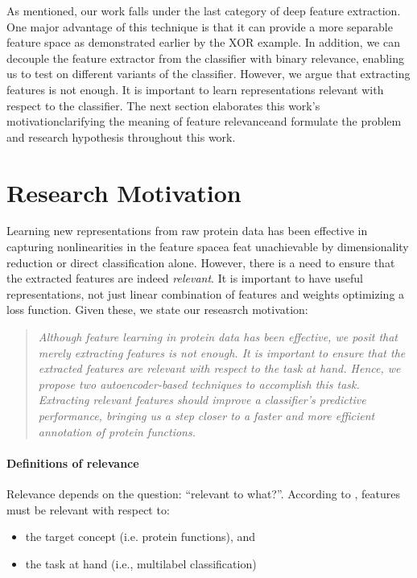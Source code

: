 \par As mentioned, our work falls under the last category of deep feature
extraction. One major advantage of this technique is that it can provide a
more separable feature space as demonstrated earlier by the XOR example. In
addition, we can decouple the feature extractor from the classifier with
binary relevance, enabling us to test on different variants of the
classifier. However, we argue that extracting features is not enough. It is
important to learn representations relevant with respect to the classifier.
The next section elaborates this work's motivation\textemdash clarifying the
meaning of feature relevance\textemdash and formulate the problem and
research hypothesis throughout this work.

\section{Research Motivation}
\label{Motivation}

\par Learning new representations from raw protein data has been effective in
capturing nonlinearities in the feature space\textemdash a feat unachievable
by dimensionality reduction or direct classification alone. However, there is
a need to ensure that the extracted features are indeed \textit{relevant}. It
is important to have useful representations, not just linear combination of
features and weights optimizing a loss function. Given these, we state our
reseasrch motivation:

\begin{quote}
  \itshape
  \small
  Although feature learning in protein data has been effective, we posit that
  merely extracting features is not enough. It is important to ensure that
  the extracted features are relevant with respect to the task at hand.
  Hence, we propose two autoencoder-based techniques to accomplish this task.
  Extracting relevant features should improve a classifier's predictive
  performance, bringing us a step closer to a faster and more efficient
  annotation of protein functions.
\end{quote}

\paragraph{Definitions of relevance}
Relevance depends on the question: ``relevant to what?''. According to
\cite{blum1997selection}, features must be relevant with respect to:
\begin{itemize}
  \item the target concept (i.e. protein functions), and
  \item the task at hand (i.e., multilabel classification)
\end{itemize}

